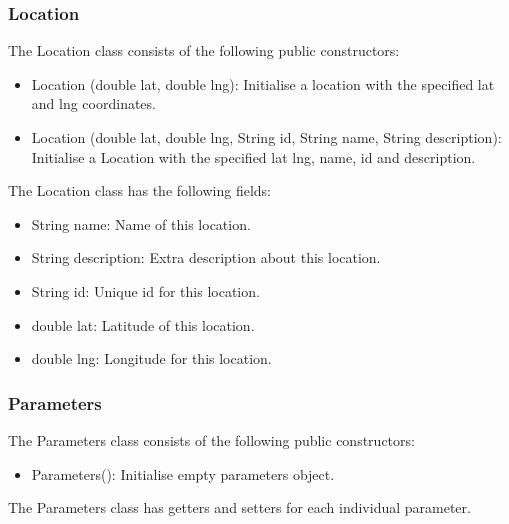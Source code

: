 \documentclass[11pt,twoside,a4paper]{article}
\begin{document}
\subsubsection{Location}
The Location class consists of the following public constructors:
\begin{itemize}
\item Location (double lat, double lng): Initialise a location with the
  specified lat and lng coordinates.
\item Location (double lat, double lng, String id, String name, String
  description): Initialise a Location with the specified lat lng, name,
  id and description. 
\end{itemize}
The Location class has the following fields:
\begin{itemize}
\item String name: Name of this location. 
\item String description: Extra description about this location.
\item String id: Unique id for this location. 
\item double lat: Latitude of this location. 
\item double lng: Longitude for this location. 
\end{itemize}
\subsubsection{Parameters}
The Parameters class consists of the following public constructors:
\begin{itemize}
\item Parameters(): Initialise empty parameters object. 
\end{itemize}

The Parameters class has getters and setters for each individual
parameter.
\end{document}
